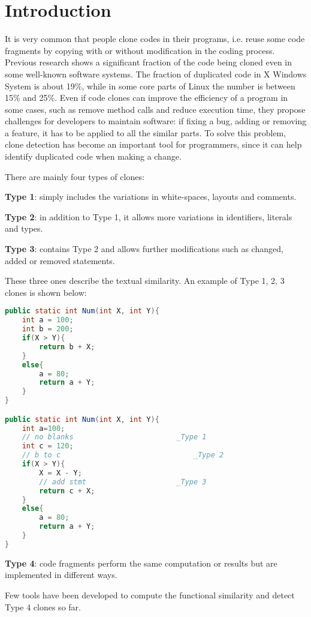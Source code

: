 \documentclass[../main.tex]{subfiles}
\begin{document}
\section{Introduction}
It is very common that people clone codes in their programs, i.e. reuse some code fragments by copying with or without modification in the coding process. 
Previous research shows a significant fraction of the code being cloned even in some well-known software systems. The fraction of duplicated code in X Windows System is about 19\%\cite{cloneinsys1}, while in some core parts of Linux the number is between 15\% and 25\%\cite{cloneinsys2}. 
Even if code clones can improve the efficiency of a program in some cases, such as remove method calls and reduce execution time, they propose challenges for developers to maintain software: if fixing a bug, adding or removing a feature, it has to be applied to all the similar parts. To solve this problem, clone detection has become an important tool for programmers, since it can help identify duplicated code when making a change.

There are mainly four types of clones:

\indent \textbf{Type 1}: simply includes the variations in white-spaces, layouts and comments.

\indent \textbf{Type 2}: in addition to Type 1, it allows more variations in identifiers, literals and types.

\indent \textbf{Type 3}: contains Type 2 and allows further modifications such as changed, added or removed statements. 

These three ones describe the textual similarity\cite{textualclone}. An example of Type 1, 2, 3 clones is shown below:  

\begin{lstlisting}[basicstyle = \small, language = Java]
public static int Num(int X, int Y){
	int a = 100;
	int b = 200;
	if(X > Y){
		return b + X;
	}
	else{
		a = 80;
		return a + Y;
	}
}

public static int Num(int X, int Y){
	int a=100;
	// no blanks						_Type 1
	int c = 120;
	// b to c								_Type 2
	if(X > Y){
		X = X - Y;
		// add stmt						_Type 3
		return c + X;
	}
	else{
		a = 80;
		return a + Y;
	}
}
\end{lstlisting}

\indent \textbf{Type 4}: code fragments perform the same computation or results but are implemented in different ways. 

Few tools have been developed to compute the functional similarity\cite{functionclone} and detect Type 4 clones so far. 
\end{document}
